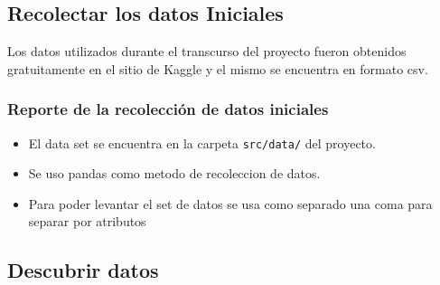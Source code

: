 \subsection{Recolectar los datos Iniciales}
    Los datos utilizados durante el transcurso del proyecto fueron obtenidos
    gratuitamente en el sitio de Kaggle y el mismo se encuentra en formato csv.
    \subsubsection{Reporte de la recolección de datos iniciales}
        \begin{itemize}
            \item El data set se encuentra en la carpeta \lstinline[columns=fixed]{src/data/} del proyecto.
            \item Se uso pandas como metodo de recoleccion de datos.
            \item Para poder levantar el set de datos se usa como separado una coma para separar por atributos
        \end{itemize}
\subsection{Descubrir datos}
